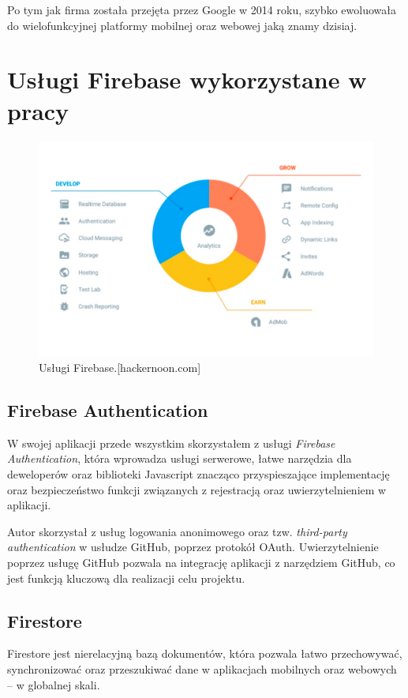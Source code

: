 Po tym jak firma została przejęta przez Google w 2014 roku,
szybko ewoluowała do wielofunkcyjnej platformy mobilnej oraz webowej jaką znamy dzisiaj.

\section{Usługi Firebase wykorzystane w pracy}

\begin{figure}
	\centering\includegraphics[width=.6\textwidth]{img/firebase.png}
	\caption{Usługi Firebase.[hackernoon.com]}\label{rys:firebase}%
\end{figure}

\subsection{Firebase Authentication}

W swojej aplikacji przede wszystkim skorzystałem z usługi \textit{Firebase Authentication},
która wprowadza usługi serwerowe,
łatwe narzędzia dla deweloperów oraz biblioteki Javascript
znacząco przyspieszające implementację oraz bezpieczeństwo
funkcji związanych z rejestracją oraz uwierzytelnieniem w aplikacji.

Autor skorzystał z usług logowania anonimowego oraz
tzw. \textit{third-party authentication} w usłudze GitHub, poprzez protokół OAuth.
Uwierzytelnienie poprzez usługę GitHub pozwala na integrację aplikacji z
narzędziem GitHub, co jest funkcją kluczową dla realizacji celu projektu.

\subsection{Firestore}

Firestore jest nierelacyjną bazą dokumentów, która pozwala łatwo przechowywać,
synchronizować oraz przeszukiwać dane w aplikacjach mobilnych oraz webowych – w globalnej skali.

